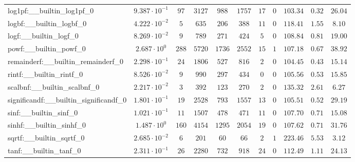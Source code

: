 \begin{tabular}{|l|c|c|c|c|c|c|c|c|c|c|}
log1pf:\_\_builtin\_log1pf\_0             & $ 9.387 \cdot 10^{-1} $ & $ 97     $ & $ 3127  $ & $ 988   $ & $ 1757  $ & $ 17  $ & $ 0 $ & $ 103.34      $ & $ 0.32    $ & $ 26.04   $ \\
logbf:\_\_builtin\_logbf\_0               & $ 4.222 \cdot 10^{-2} $ & $ 5      $ & $ 635   $ & $ 206   $ & $ 388   $ & $ 11  $ & $ 0 $ & $ 118.41      $ & $ 1.55    $ & $ 8.10    $ \\
logf:\_\_builtin\_logf\_0                 & $ 8.269 \cdot 10^{-2} $ & $ 9      $ & $ 789   $ & $ 271   $ & $ 424   $ & $ 5   $ & $ 0 $ & $ 108.84      $ & $ 0.81    $ & $ 19.00   $ \\
powf:\_\_builtin\_powf\_0                 & $ 2.687 \cdot 10^{0}  $ & $ 288    $ & $ 5720  $ & $ 1736  $ & $ 2552  $ & $ 15  $ & $ 1 $ & $ 107.18      $ & $ 0.67    $ & $ 38.92   $ \\
remainderf:\_\_builtin\_remainderf\_0     & $ 2.298 \cdot 10^{-1} $ & $ 24     $ & $ 1806  $ & $ 527   $ & $ 816   $ & $ 2   $ & $ 0 $ & $ 104.45      $ & $ 0.43    $ & $ 15.14   $ \\
rintf:\_\_builtin\_rintf\_0               & $ 8.526 \cdot 10^{-2} $ & $ 9      $ & $ 990   $ & $ 297   $ & $ 434   $ & $ 0   $ & $ 0 $ & $ 105.56      $ & $ 0.53    $ & $ 15.85   $ \\
scalbnf:\_\_builtin\_scalbnf\_0           & $ 2.217 \cdot 10^{-2} $ & $ 3      $ & $ 392   $ & $ 123   $ & $ 270   $ & $ 2   $ & $ 0 $ & $ 135.32      $ & $ 2.61    $ & $ 6.27    $ \\
significandf:\_\_builtin\_significandf\_0 & $ 1.801 \cdot 10^{-1} $ & $ 19     $ & $ 2528  $ & $ 793   $ & $ 1557  $ & $ 13  $ & $ 0 $ & $ 105.51      $ & $ 0.52    $ & $ 29.19   $ \\
sinf:\_\_builtin\_sinf\_0                 & $ 1.021 \cdot 10^{-1} $ & $ 11     $ & $ 1507  $ & $ 478   $ & $ 471   $ & $ 11  $ & $ 0 $ & $ 107.70      $ & $ 0.71    $ & $ 15.08   $ \\
sinhf:\_\_builtin\_sinhf\_0               & $ 1.487 \cdot 10^{0}  $ & $ 160    $ & $ 4154  $ & $ 1295  $ & $ 2054  $ & $ 19  $ & $ 0 $ & $ 107.62      $ & $ 0.71    $ & $ 31.76   $ \\
sqrtf:\_\_builtin\_sqrtf\_0               & $ 2.685 \cdot 10^{-2} $ & $ 6      $ & $ 201   $ & $ 60    $ & $ 66    $ & $ 2   $ & $ 1 $ & $ 223.46      $ & $ 5.53    $ & $ 3.12    $ \\
tanf:\_\_builtin\_tanf\_0                 & $ 2.311 \cdot 10^{-1} $ & $ 26     $ & $ 2280  $ & $ 732   $ & $ 918   $ & $ 24  $ & $ 0 $ & $ 112.49      $ & $ 1.11    $ & $ 24.13   $ \\

\end{tabular}
